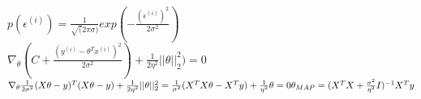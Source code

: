\begin{answer}
$
p(\epsilon^{(i)}) = \frac{1}{\sqrt(2\pi\sigma)} exp(-\frac{(\epsilon^{(i)})^2}{2\sigma^2})
$ \\
$
\nabla_\theta (C + \frac{(y^{(i)} - \theta^T x^{(i)})^2}{2 \sigma^2}) + \frac{1}{2\eta^2} ||\theta||_2^2) = 0
$ \\
$
\nabla_\theta \frac{1}{2\sigma^2} (X\theta - y)^T (X\theta - y) +  \frac{1}{2\eta^2} ||\theta||_2^2  =  \frac{1}{\sigma^2} (X^TX\theta - X^T y)+ \frac{1}{\eta^2}\theta = 0 \\
\theta_{MAP} = (X^TX + \frac{\sigma^2}{\eta^2}I)^{-1} X^T y
$
\end{answer}
